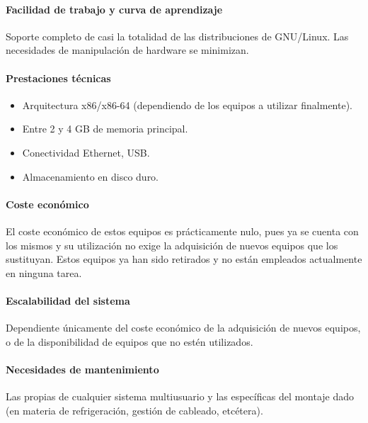 \paragraph{Facilidad de trabajo y curva de aprendizaje\\}

Soporte completo de casi la totalidad de las distribuciones de GNU/Linux. Las necesidades de manipulación de hardware se minimizan.

\paragraph{Prestaciones técnicas}
\begin{itemize}
  \item Arquitectura x86/x86-64 (dependiendo de los equipos a utilizar finalmente).
  \item Entre 2 y 4 GB de memoria principal.
  \item Conectividad Ethernet, USB.
  \item Almacenamiento en disco duro.
\end{itemize}

\paragraph{Coste económico\\}

El coste económico de estos equipos es prácticamente nulo, pues ya se cuenta con los mismos y su utilización no exige la adquisición de nuevos equipos que los sustituyan. Estos equipos ya han sido retirados y no están empleados actualmente en ninguna tarea.

\paragraph{Escalabilidad del sistema\\}

Dependiente únicamente del coste económico de la adquisición de nuevos equipos, o de la disponibilidad de equipos que no estén utilizados.

\paragraph{Necesidades de mantenimiento\\}

Las propias de cualquier sistema multiusuario y las específicas del montaje dado (en materia de refrigeración, gestión de cableado, etcétera).

